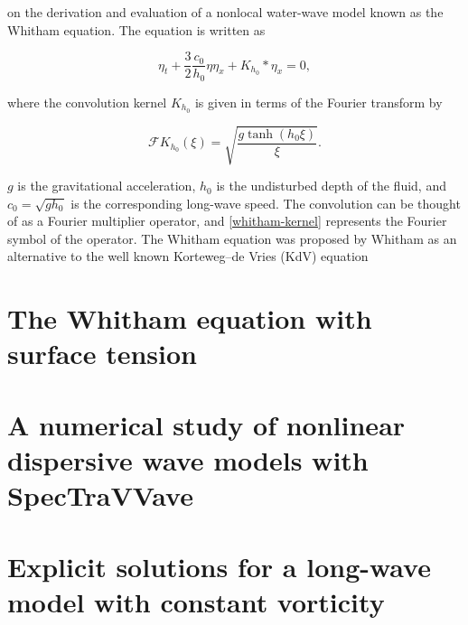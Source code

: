 on the derivation and evaluation of a nonlocal water-wave model
known as the Whitham equation. The equation is written as

\begin{equation}
\eta_t + \frac{3}{2} \frac{c_0}{h_0} \eta \eta_x + K_{h_0} \ast \eta_x = 0, 
\label{whitham-equation}
\end{equation}

where the convolution kernel $K_{h_0}$ is given in terms of the Fourier
transform by

\begin{equation}
\mathcal{F}K_{h_0} (\xi) =  \sqrt{\frac{g \tanh(h_0\xi)}{\xi}}.
\label{whitham-kernel}
\end{equation}

$g$ is the gravitational acceleration, $h_0$ is the undisturbed depth of
the fluid, and $c_0 = \sqrt{gh_0}$ is the corresponding long-wave speed.
The convolution can be thought of as a Fourier multiplier operator,
and \eqref{whitham-kernel} represents the Fourier symbol of the operator.
The Whitham equation was proposed by Whitham \cite{Whitham1967} as an
alternative to the well known Korteweg–de Vries (KdV) equation


\section{The Whitham equation with surface tension}






\section{A numerical study of nonlinear dispersive wave models with SpecTraVVave}





\section{Explicit solutions for a long-wave model with constant vorticity}

